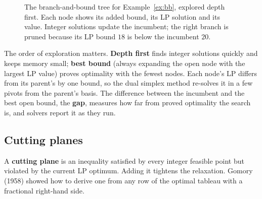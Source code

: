 \documentclass[11pt,a4paper]{article}
\numberwithin{equation}{section}
\theoremstyle{definition}
\begin{document}
\begin{figure}[H]
\centering
{}
\caption{The branch-and-bound tree for Example~\ref{ex:bb}, explored depth first. Each node shows its added bound, its LP solution and its value. Integer solutions update the incumbent; the right branch is pruned because its LP bound $18$ is below the incumbent $20$.}
\label{fig:bbtree}
\end{figure}

The order of exploration matters. \textbf{Depth first} finds integer solutions quickly and keeps memory small; \textbf{best bound} (always expanding the open node with the largest LP value) proves optimality with the fewest nodes. Each node's LP differs from its parent's by one bound, so the dual simplex method re-solves it in a few pivots
from the parent's basis. The difference between the incumbent and the best open bound, the \textbf{gap}, measures how far from proved optimality the search is, and solvers report it as they run.

\subsection{Cutting planes}
\label{ssec:cuts}

A \textbf{cutting plane} is an inequality satisfied by every integer feasible point but violated by the current LP optimum. Adding it tightens the relaxation. Gomory (1958) showed how to derive one from any row of the optimal tableau with a fractional right-hand side.
\end{document}
